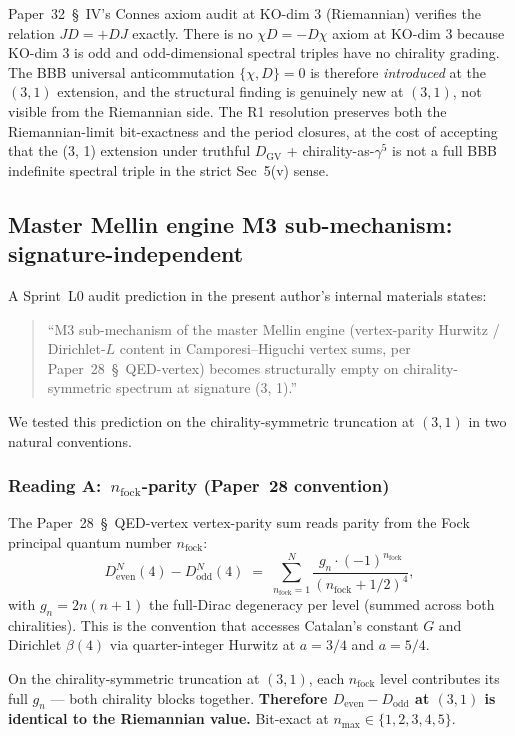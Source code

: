 \documentclass[11pt,a4paper]{article}
\theoremstyle{plain}
\theoremstyle{definition}
\newcommand{\nmax}{n_{\max}}
\newcommand{\DGV}{D_{\mathrm{GV}}}
\begin{document}
Paper~32~\S~IV's Connes axiom audit at KO-dim 3 (Riemannian) verifies
the relation $J D = +D J$ exactly. There is no $\chi D = -D\chi$ axiom
at KO-dim 3 because KO-dim 3 is odd and odd-dimensional spectral
triples have no chirality grading. The BBB universal anticommutation
$\{\chi, D\} = 0$ is therefore \emph{introduced} at the $(3, 1)$
extension, and the structural finding is genuinely new at $(3, 1)$,
not visible from the Riemannian side. The R1 resolution preserves
both the Riemannian-limit bit-exactness and the period closures, at
the cost of accepting that the (3, 1) extension under truthful $\DGV$ +
chirality-as-$\gamma^5$ is not a full BBB indefinite spectral triple
in the strict Sec~5(v) sense.

\subsection{Master Mellin engine M3 sub-mechanism: signature-independent}
\label{sec:m3_convention}

A Sprint~L0 audit prediction in the present author's internal materials
states:\
\begin{quote}
``M3 sub-mechanism of the master Mellin engine (vertex-parity Hurwitz /
Dirichlet-$L$ content in Camporesi--Higuchi vertex sums, per
Paper~28~\S~QED-vertex) becomes structurally empty on chirality-symmetric
spectrum at signature (3, 1).''
\end{quote}
We tested this prediction on the chirality-symmetric truncation at
$(3, 1)$ in two natural conventions.

\subsubsection{Reading A:\ $n_\text{fock}$-parity (Paper~28 convention)}

The Paper~28~\S~QED-vertex vertex-parity sum reads parity from the
Fock principal quantum number $n_\text{fock}$:
\[
   D_{\mathrm{even}}^N(4) - D_{\mathrm{odd}}^N(4)
   \;=\; \sum_{n_\text{fock} = 1}^N
         \frac{g_n \cdot (-1)^{n_\text{fock}}}
              {(n_\text{fock} + 1/2)^4},
\]
with $g_n = 2 n (n+1)$ the full-Dirac degeneracy per level (summed
across both chiralities). This is the convention that accesses
Catalan's constant $G$ and Dirichlet $\beta(4)$ via quarter-integer
Hurwitz at $a = 3/4$ and $a = 5/4$.

On the chirality-symmetric truncation at $(3, 1)$, each
$n_\text{fock}$ level contributes its full $g_n$ — both chirality
blocks together. \textbf{Therefore $D_{\mathrm{even}} - D_{\mathrm{odd}}$
at $(3, 1)$ is identical to the Riemannian value.} Bit-exact at
$\nmax \in \{1, 2, 3, 4, 5\}$.
\end{document}
